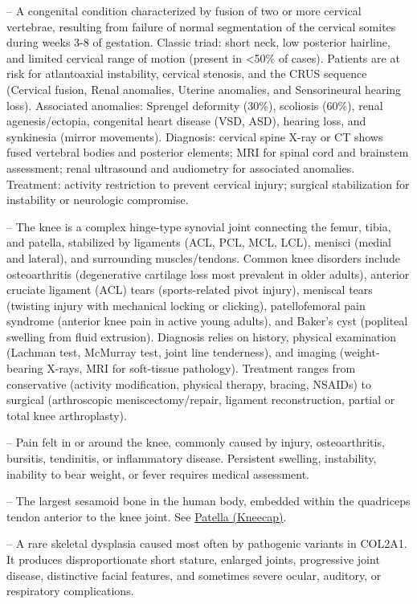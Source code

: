 -- A congenital condition characterized by fusion of two or more cervical vertebrae, resulting from failure of normal segmentation of the cervical somites during weeks 3-8 of gestation. Classic triad: short neck, low posterior hairline, and limited cervical range of motion (present in <50\% of cases). Patients are at risk for atlantoaxial instability, cervical stenosis, and the CRUS sequence (Cervical fusion, Renal anomalies, Uterine anomalies, and Sensorineural hearing loss). Associated anomalies: Sprengel deformity (30\%), scoliosis (60\%), renal agenesis/ectopia, congenital heart disease (VSD, ASD), hearing loss, and synkinesia (mirror movements). Diagnosis: cervical spine X-ray or CT shows fused vertebral bodies and posterior elements; MRI for spinal cord and brainstem assessment; renal ultrasound and audiometry for associated anomalies. Treatment: activity restriction to prevent cervical injury; surgical stabilization for instability or neurologic compromise.

-- The knee is a complex hinge-type synovial joint connecting the femur, tibia, and patella, stabilized by ligaments (ACL, PCL, MCL, LCL), menisci (medial and lateral), and surrounding muscles/tendons. Common knee disorders include osteoarthritis (degenerative cartilage loss most prevalent in older adults), anterior cruciate ligament (ACL) tears (sports-related pivot injury), meniscal tears (twisting injury with mechanical locking or clicking), patellofemoral pain syndrome (anterior knee pain in active young adults), and Baker's cyst (popliteal swelling from fluid extrusion). Diagnosis relies on history, physical examination (Lachman test, McMurray test, joint line tenderness), and imaging (weight-bearing X-rays, MRI for soft-tissue pathology). Treatment ranges from conservative (activity modification, physical therapy, bracing, NSAIDs) to surgical (arthroscopic meniscectomy/repair, ligament reconstruction, partial or total knee arthroplasty).

-- Pain felt in or around the knee, commonly caused by injury, osteoarthritis, bursitis, tendinitis, or inflammatory disease. Persistent swelling, instability, inability to bear weight, or fever requires medical assessment.

-- The largest sesamoid bone in the human body, embedded within the quadriceps tendon anterior to the knee joint. See \hyperlink{Patella (Kneecap)}{Patella (Kneecap)}.

-- A rare skeletal dysplasia caused most often by pathogenic variants in COL2A1. It produces disproportionate short stature, enlarged joints, progressive joint disease, distinctive facial features, and sometimes severe ocular, auditory, or respiratory complications.

